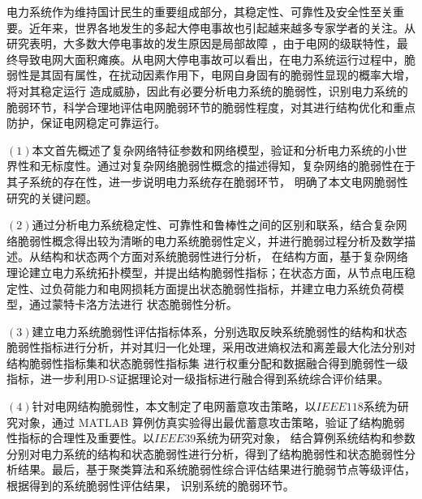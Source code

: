 \begin{cabstract}
电力系统作为维持国计民生的重要组成部分，其稳定性、可靠性及安全性至关重要。近年来，世界各地发生的多起大停电事故也引起越来越多专家学者的关注。从研究表明，大多数大停电事故的发生原因是局部故障
，由于电网的级联特性，最终导致电网大面积瘫痪。从电网大停电事故可以看出，在电力系统运行过程中，脆弱性是其固有属性，在扰动因素作用下，电网自身固有的脆弱性显现的概率大增，将对其稳定运行
造成威胁，因此有必要分析电力系统的脆弱性，识别电力系统的脆弱环节，科学合理地评估电网脆弱环节的脆弱性程度，对其进行结构优化和重点防护，保证电网稳定可靠运行。

$(1)$本文首先概述了复杂网络特征参数和网络模型，验证和分析电力系统的小世界性和无标度性。通过对复杂网络脆弱性概念的描述得知，复杂网络的脆弱性在于其子系统的存在性，进一步说明电力系统存在脆弱环节，
明确了本文电网脆弱性研究的关键问题。

$(2)$通过分析电力系统稳定性、可靠性和鲁棒性之间的区别和联系，结合复杂网络脆弱性概念得出较为清晰的电力系统脆弱性定义，并进行脆弱过程分析及数学描述。从结构和状态两个方面对系统脆弱性进行分析，
在结构方面，基于复杂网络理论建立电力系统拓扑模型，并提出结构脆弱性指标；在状态方面，从节点电压稳定性、过负荷能力和电网损耗方面提出状态脆弱性指标，并建立电力系统负荷模型，通过蒙特卡洛方法进行
状态脆弱性分析。

$(3)$建立电力系统脆弱性评估指标体系，分别选取反映系统脆弱性的结构和状态脆弱性指标进行分析，并对其归一化处理，采用改进熵权法和离差最大化法分别对结构脆弱性指标集和状态脆弱性指标集
进行权重分配和数据融合得到脆弱性一级指标，进一步利用D-S证据理论对一级指标进行融合得到系统综合评价结果。

$(4)$针对电网结构脆弱性，本文制定了电网蓄意攻击策略，以$IEEE118$系统为研究对象，通过 MATLAB 算例仿真实验得出最优蓄意攻击策略，验证了结构脆弱性指标的合理性及重要性。以$IEEE39$系统为研究对象，
结合算例系统结构和参数分别对电力系统的结构和状态脆弱性进行分析，得到了结构脆弱性和状态脆弱性分析结果。最后，基于聚类算法和系统脆弱性综合评估结果进行脆弱节点等级评估，根据得到的系统脆弱性评估结果，
识别系统的脆弱环节。

\end{cabstract}


\begin{eabstract}

\end{eabstract}

\ekeywords{} 